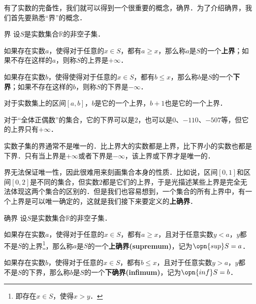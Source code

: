 
\begin{issues}
\issueDraft
\end{issues}



有了实数的完备性，我们就可以得到一个很重要的概念，确界．为了介绍确界，我们首先要熟悉“界”的概念．

\begin{definition}{界}
设$S$是实数集合$\mathbb{R}$的非空子集．

如果存在实数$a$，使得对于任意的$x\in S$，都有$a\geq x$，那么称$a$是$S$的一个\textbf{上界}；如果不存在这样的$a$，则称$S$的上界是$+\infty$．

如果存在实数$b$，使得使得对于任意的$x\in S$，都有$b\leq x$，那么称$b$是$S$的一个\textbf{下界}；如果不存在这样的$b$，则称$S$的下界是$-\infty$．
\end{definition}

\begin{example}{}
对于实数集上的区间$[a, b]$，$b$是它的一个上界，$b+1$也是它的一个上界．

对于“全体正偶数”的集合，它的下界可以是$2$，也可以是$0$、$-110$、$-507$等，但它的上界只有$+\infty$．
\end{example}

实数子集的界通常不是唯一的．比上界大的实数都是上界，比下界小的实数也都是下界．只有当上界是$+\infty$或者下界是$-\infty$，该上界或下界才是唯一的．

界无法保证唯一性，因此很难用来刻画集合本身的性质．比如说，区间$[0, 1]$和区间$[0, 2]$是不同的集合，但实数$2$都是它们的上界，于是光描述某些上界是完全无法体现这两个集合的区别的．但是我们也容易想到，一个集合的所有上界中，有一个上界是可以唯一确定的，这就是我们接下来要定义的\textbf{上确界}．

\begin{definition}{确界}
设$S$是实数集合$\mathbb{R}$的非空子集．

如果存在实数$a$，使得对于任意的$x\in S$，都有$a\geq x$，且对于任意实数$y<a$，$y$都不是$S$的上界\footnote{即存在$x\in S$，使得$x>y$．}，那么称$a$是$S$的一个\textbf{上确界(supremum)}，记为$\opn{sup} S=a$．

如果存在实数$b$，使得对于任意的$x\in S$，都有$b\leq x$，且对于任意实数$y>a$，$y$都不是$S$的下界，那么称$b$是$S$的一个\textbf{下确界(infimum)}，记为$\opn{inf} S=b$．



\end{definition}


